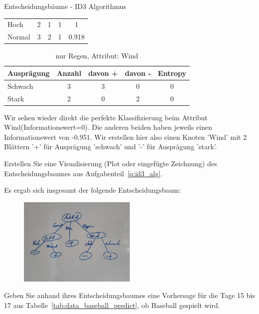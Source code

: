 \begin{task}[credit=16]{Entscheidungsbäume - ID3 Algorithmus}
\begin{subtask}[points=10,title=ID3 Algorithmus]
\begin{solution}
\begin{table}[H]
\begin{tabular}{l|c|c|c|c}
		\midrule
		Hoch&2&1&1&1\\
		Normal&3&2&1&0.918\\
		\bottomrule
	\end{tabular}
\end{table}
\begin{table}[H]
	\centering
	\caption{nur Regen, Attribut: Wind}
	\begin{tabular}{l|c|c|c|c}
		\toprule
		\textbf{Ausprägung} & \textbf{Anzahl} & \textbf{davon +}  & \textbf{davon -} &\textbf{Entropy} \\
		\midrule
		Schwach&3&3&0&0\\
		Stark&2&0&2&0\\
		\bottomrule
	\end{tabular}
\end{table}
Wir sehen wieder direkt die perfekte Klassifizierung beim Attribut Wind(Informationswert=0). Die anderen beiden haben jeweils einen Informationswert von -0.951. Wir erstellen hier also einen Knoten 'Wind' mit 2 Blättern '+' für Ausprägung 'schwach' und '-' für Ausprägung 'stark'.
\end{solution}

\end{subtask}

\begin{subtask}[points=3,title=Visualisierung]
Erstellen Sie eine Visualisierung (Plot oder eingefügte Zeichnung) des Entscheidungsbaumes aus Aufgabenteil~\ref{q:id3_alg}.

\begin{solution}
Es ergab sich insgesamt der folgende Entscheidungsbaum:
\begin{figure}[H]
	\includegraphics[width=0.5\textwidth]{1a.jpg}
\end{figure}
\end{solution}

\end{subtask}

\begin{subtask}[points=3,title=Vorhersage]
Geben Sie anhand ihres Entscheidungsbaumes eine Vorhersage für die Tage 15 bis 17 aus Tabelle~\ref{tab:data_baseball_predict}, ob Baseball gespielt wird.

\begin{solution}
\end{solution}

\end{subtask}
\end{task}